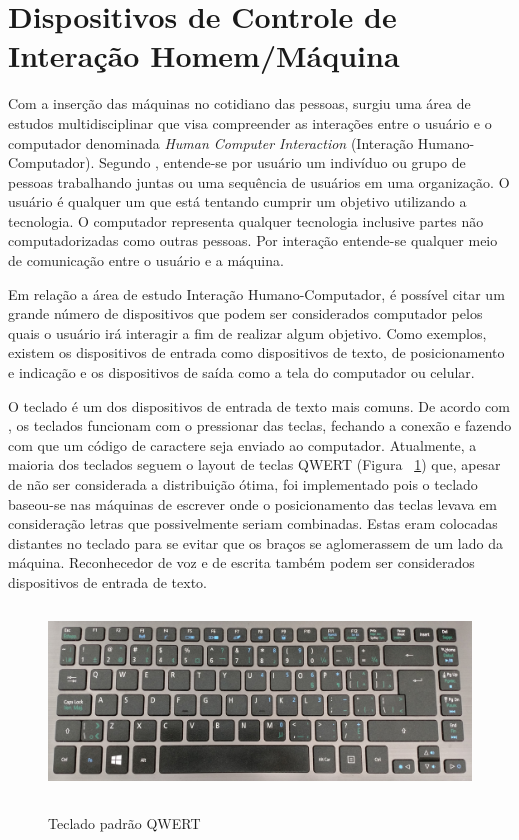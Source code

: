 \section{Dispositivos de Controle de Interação Homem/Máquina}
\label{s.dispositivos}

Com a inserção das máquinas no cotidiano das pessoas, surgiu uma área de estudos multidisciplinar que visa compreender as interações entre o usuário e o computador denominada \textit{Human Computer Interaction} (Interação Humano-Computador). Segundo , entende-se por usuário um indivíduo ou grupo de pessoas trabalhando juntas ou uma sequência de usuários em uma organização. O usuário é qualquer um que está tentando cumprir um objetivo utilizando a tecnologia. O computador representa qualquer tecnologia inclusive partes não computadorizadas como outras pessoas. Por interação entende-se qualquer meio de comunicação entre o usuário e a máquina.  

Em relação a área de estudo Interação Humano-Computador, é possível citar um grande número de dispositivos que podem ser considerados computador pelos quais o usuário irá interagir a fim de realizar algum objetivo. Como exemplos, existem os dispositivos de entrada como dispositivos de texto, de posicionamento e indicação e os dispositivos de saída como a tela do computador ou celular. 

O teclado é um dos dispositivos de entrada de texto mais comuns. De acordo com , os teclados funcionam com o pressionar das teclas, fechando a conexão e fazendo com que um código de caractere seja enviado ao computador. Atualmente, a maioria dos teclados seguem o layout de teclas QWERT (Figura ~\ref{f.qwert}) que, apesar de não ser considerada a distribuição ótima, foi implementado pois o teclado baseou-se nas máquinas de escrever onde o posicionamento das teclas levava em consideração letras que possivelmente seriam combinadas. Estas eram colocadas distantes no teclado para se evitar que os braços se aglomerassem de um lado da máquina. Reconhecedor de voz e de escrita também podem ser considerados dispositivos de entrada de texto.

\begin{figure}[H]
	\caption{\small Teclado padrão QWERT}
	\centering
	\includegraphics[height= 5cm]{Imagens/qwert.jpg}
	\label{f.qwert}
\end{figure}

